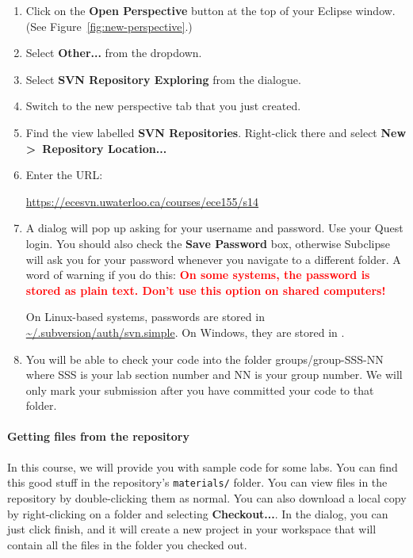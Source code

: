\documentclass[10pt]{article}
\begin{document}
\begin{enumerate}
\item Click on the \textbf{Open Perspective} button at the top of your Eclipse window. (See Figure~\ref{fig:new-perspective}.)
\item Select \textbf{Other...} from the dropdown.
\item Select \textbf{SVN Repository Exploring} from the dialogue.
\item Switch to the new perspective tab that you just created.
\item Find the view labelled \textbf{SVN Repositories}. Right-click there and select \textbf{New \textgreater~Repository Location...}
\item Enter the URL:

\qquad \url{https://ecesvn.uwaterloo.ca/courses/ece155/s14} 
\item A dialog will pop up asking for your username and password. Use your Quest login. You should also check the \textbf{Save Password} box, otherwise Subclipse will ask you for your password whenever you navigate to a different folder. A word of warning if you do this: \textcolor{Red}{\textbf{On some systems, the password is stored as plain text. Don't use this option on shared computers!}}

On Linux-based systems, passwords are stored in \url{~/.subversion/auth/svn.simple}. On Windows, they are stored in .

\item You will be able to check your code into the folder groups/group-SSS-NN where SSS is your lab section number and NN is your group number. We will only mark your submission after you have committed your code to that folder.
\end{enumerate}

\paragraph{Getting files from the repository} In this course, we will provide you with sample code for some labs. You can find this good stuff in the repository's {\tt materials/} folder. You can view files in the repository by double-clicking them as normal. You can also download a local copy by right-clicking on a folder and selecting \textbf{Checkout...}. In the dialog, you can just click finish, and it will create a new project in your workspace that will contain all the files in the folder you checked out.
\end{document}
